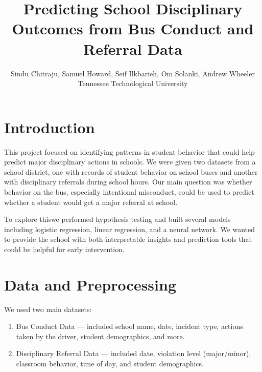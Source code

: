\documentclass[letterpaper]{article}
\begin{document}

\nocopyright

\title{Predicting School Disciplinary Outcomes from Bus Conduct and Referral Data
}
\author{Sindu Chitraju, Samuel Howard, Seif Ilkbarieh, Om Solanki, Andrew Wheeler\\
Tennessee Technological University
}

\maketitle

\section*{Introduction}

This project focused on identifying patterns in student behavior that 
could help predict major disciplinary actions in schools. We were given 
two datasets from a school district, one with records of student behavior 
on school buses and another with disciplinary referrals during school 
hours. Our main question was whether behavior on the bus, especially 
intentional misconduct, could be used to predict whether a student would 
get a major referral at school.

To explore thiswe performed hypothesis testing and built several models 
including logistic regression, linear regression, and a neural network. 
We wanted to provide the school with both interpretable insights and 
prediction tools that could be helpful for early intervention.

\section*{Data and Preprocessing}

We used two main datasets:

\begin{enumerate}
    \item Bus Conduct Data --- included school name, date, incident type,
    actions taken by the driver, student demographics, and more.

    \item Disciplinary Referral Data --- included date, violation level
    (major/minor), classroom behavior, time of day, and student demographics.
\end{enumerate}
\end{document}
